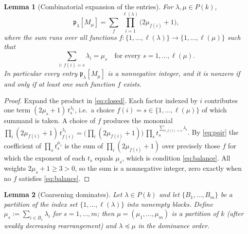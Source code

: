 \documentclass[12pt]{article}
\newtheorem{lemma}{Lemma}
\theoremstyle{definition}
\begin{document}
\begin{lemma}[Combinatorial expansion of the entries]\label{lem:expand}
For $\lambda,\mu\in P(k)$,
\[
\mathfrak{p}_\lambda[M_\mu]
=\sum_{f}\ \prod_{i=1}^{\ell(\lambda)}\big(2\mu_{f(i)}+1\big),
\tag{8}\label{eq:expand}
\]
where the sum runs over all functions $f:\{1,\dots,\ell(\lambda)\}\to\{1,\dots,\ell(\mu)\}$
such that
\[
\sum_{i:\,f(i)=s}\lambda_i=\mu_s\quad\text{for every }s=1,\dots,\ell(\mu).
\tag{9}\label{eq:balance}
\]
In particular every entry $\mathfrak{p}_\lambda[M_\mu]$ is a nonnegative integer, and it
is nonzero if and only if at least one such function $f$ exists.
\end{lemma}

\begin{proof}
Expand the product in \eqref{eq:closed}.  Each factor indexed by $i$ contributes one term
$(2\mu_{s}+1)\,t_{s}^{\lambda_i}$, i.e.\ a choice $f(i)=s\in\{1,\dots,\ell(\mu)\}$ of which
summand is taken.  A choice of $f$ produces the monomial
$\prod_{i}(2\mu_{f(i)}+1)\,t_{f(i)}^{\lambda_i}
=\big(\prod_i(2\mu_{f(i)}+1)\big)\,\prod_{s}t_s^{\sum_{i:f(i)=s}\lambda_i}$.
By \eqref{eq:pair} the coefficient of $\prod_s t_s^{\mu_s}$ is the sum of
$\prod_i(2\mu_{f(i)}+1)$ over precisely those $f$ for which the exponent of each $t_s$
equals $\mu_s$, which is condition \eqref{eq:balance}.  All weights
$2\mu_s+1\ge 3>0$, so the sum is a nonnegative integer, zero exactly when no $f$ satisfies
\eqref{eq:balance}.
\end{proof}

\begin{lemma}[Coarsening dominates]\label{lem:merge}
Let $\lambda\in P(k)$ and let $\{B_1,\dots,B_m\}$ be a partition of the index set
$\{1,\dots,\ell(\lambda)\}$ into nonempty blocks.  Define $\mu_s:=\sum_{i\in B_s}\lambda_i$
for $s=1,\dots,m$; then $\mu=(\mu_1,\dots,\mu_m)$ is a partition of $k$ (after weakly
decreasing rearrangement) and $\lambda\preceq\mu$ in the dominance order.
\end{lemma}
\end{document}
